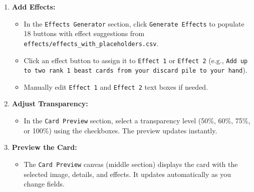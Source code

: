 \begin{enumerate}
    \item \textbf{Add Effects:}
          \begin{itemize}
              \item In the \texttt{Effects Generator} section, click \texttt{Generate Effects} to populate 18 buttons with effect suggestions from \texttt{effects/effects\_with\_placeholders.csv}.
              \item Click an effect button to assign it to \texttt{Effect 1} or \texttt{Effect 2} (e.g., \texttt{Add up to two rank 1 beast cards from your discard pile to your hand}).
              \item Manually edit \texttt{Effect 1} and \texttt{Effect 2} text boxes if needed.
          \end{itemize}

    \item \textbf{Adjust Transparency:}
          \begin{itemize}
              \item In the \texttt{Card Preview} section, select a transparency level (50\%, 60\%, 75\%, or 100\%) using the checkboxes. The preview updates instantly.
          \end{itemize}

    \item \textbf{Preview the Card:}
          \begin{itemize}
              \item The \texttt{Card Preview} canvas (middle section) displays the card with the selected image, details, and effects. It updates automatically as you change fields.
          \end{itemize}


\end{enumerate}
